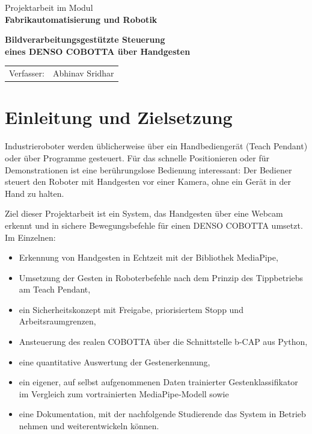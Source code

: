 \documentclass[11pt,a4paper]{article}
\begin{document}
\raggedright

\begin{titlepage}
\centering
\vspace*{4cm}
{\large Projektarbeit im Modul\\[0.3em] \textbf{Fabrikautomatisierung und Robotik}\par}
\vspace{1.5cm}
{\LARGE\bfseries Bildverarbeitungsgestützte Steuerung\\[0.3em] eines DENSO COBOTTA über Handgesten\par}
\vspace{2.5cm}
{\large
\begin{tabular}{rl}
Verfasser: & Abhinav Sridhar \\
\end{tabular}\par}
\vfill
\end{titlepage}

\tableofcontents
\newpage

\section{Einleitung und Zielsetzung}

Industrieroboter werden üblicherweise über ein Handbediengerät (Teach Pendant) oder über
Programme gesteuert. Für das schnelle Positionieren oder für Demonstrationen ist eine
berührungslose Bedienung interessant: Der Bediener steuert den Roboter mit Handgesten vor einer
Kamera, ohne ein Gerät in der Hand zu halten.

Ziel dieser Projektarbeit ist ein System, das Handgesten über eine Webcam erkennt und in sichere
Bewegungsbefehle für einen DENSO COBOTTA umsetzt. Im Einzelnen:

\begin{itemize}
  \item Erkennung von Handgesten in Echtzeit mit der Bibliothek MediaPipe,
  \item Umsetzung der Gesten in Roboterbefehle nach dem Prinzip des Tippbetriebs am Teach Pendant,
  \item ein Sicherheitskonzept mit Freigabe, priorisiertem Stopp und Arbeitsraumgrenzen,
  \item Ansteuerung des realen COBOTTA über die Schnittstelle b-CAP aus Python,
  \item eine quantitative Auswertung der Gestenerkennung,
  \item ein eigener, auf selbst aufgenommenen Daten trainierter Gestenklassifikator im Vergleich
        zum vortrainierten MediaPipe-Modell sowie
  \item eine Dokumentation, mit der nachfolgende Studierende das System in Betrieb nehmen und
        weiterentwickeln können.
\end{itemize}
\end{document}
